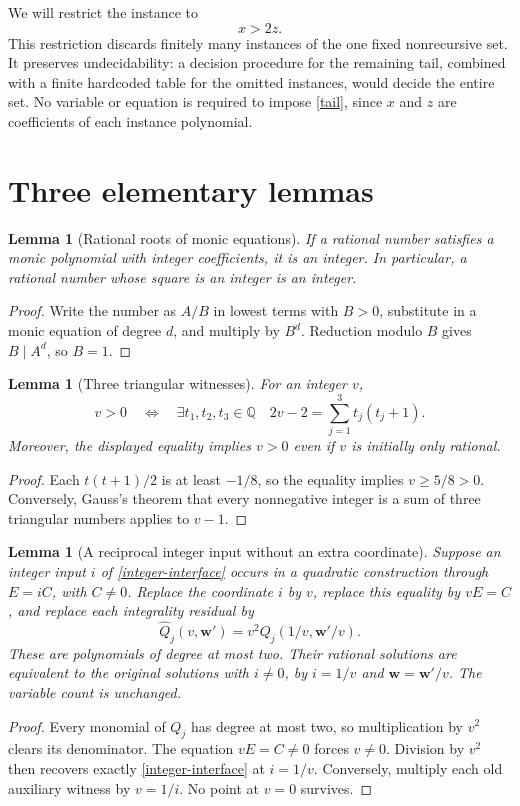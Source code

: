 \documentclass[11pt]{article}
\newtheorem{lemma}[theorem]{Lemma}
\newcommand{\Q}{\mathbb Q}
\begin{document}
We will restrict the instance to
\begin{equation}\label{tail}
 x>2z.
\end{equation}
This restriction discards finitely many instances of the one fixed
nonrecursive set. It preserves undecidability: a decision procedure for
the remaining tail, combined with a finite hardcoded table for the
omitted instances, would decide the entire set. No variable or equation
is required to impose \eqref{tail}, since \(x\) and \(z\) are
coefficients of each instance polynomial.

\section{Three elementary lemmas}
\begin{lemma}[Rational roots of monic equations]\label{monic}
If a rational number satisfies a monic polynomial with integer
coefficients, it is an integer. In particular, a rational number whose
square is an integer is an integer.
\end{lemma}
\begin{proof}
Write the number as \(A/B\) in lowest terms with \(B>0\), substitute
in a monic equation of degree \(d\), and multiply by \(B^d\).
Reduction modulo \(B\) gives \(B\mid A^d\), so \(B=1\).
\end{proof}

\begin{lemma}[Three triangular witnesses]\label{triangular}
For an integer \(v\),
\[
 v>0\quad\Longleftrightarrow\quad
 \exists t_1,t_2,t_3\in\Q\quad
 2v-2=\sum_{j=1}^3t_j(t_j+1).
\]
Moreover, the displayed equality implies \(v>0\) even if \(v\) is
initially only rational.
\end{lemma}
\begin{proof}
Each \(t(t+1)/2\) is at least \(-1/8\), so the equality implies
\(v\ge5/8>0\). Conversely, Gauss's theorem that every nonnegative
integer is a sum of three triangular numbers applies to \(v-1\).
\end{proof}

\begin{lemma}[A reciprocal integer input without an extra coordinate]
\label{reciprocal}
Suppose an integer input \(i\) of \eqref{integer-interface} occurs in a
quadratic construction through \(E=iC\), with \(C\ne0\). Replace the
coordinate \(i\) by \(v\), replace this equality by \(vE=C\), and
replace each integrality residual by
\[
 \widehat Q_j(v,\mathbf w')
    =v^2Q_j(1/v,\mathbf w'/v).
\]
These are polynomials of degree at most two. Their rational solutions
are equivalent to the original solutions with \(i\ne0\), by
\(i=1/v\) and \(\mathbf w=\mathbf w'/v\). The variable count is
unchanged.
\end{lemma}
\begin{proof}
Every monomial of \(Q_j\) has degree at most two, so multiplication
by \(v^2\) clears its denominator. The equation \(vE=C\ne0\)
forces \(v\ne0\). Division by \(v^2\) then recovers exactly
\eqref{integer-interface} at \(i=1/v\). Conversely, multiply each
old auxiliary witness by \(v=1/i\). No point at \(v=0\) survives.
\end{proof}
\end{document}
